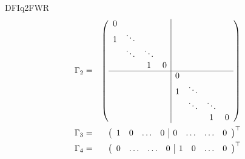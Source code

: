 \begin{command}{DFIq2FWR}
\begin{eqnarray}
\Gamma_2 &=&
\left(\begin{array}{cccc|cccc}
0 &&&\\
1 & \ddots &&\\
& \ddots & \ddots &\\
&& 1 & 0 \\
\hline &&&& 0 \\
&&&& 1 & \ddots \\
&&&& & \ddots & \ddots \\
&&&& & & 1 & 0
\end{array}\right)\\
\Gamma_3 &=&
\left(\begin{array}{cccc|cccc}
1 & 0 & \hdots & 0 & 0 & \hdots & \hdots & 0
\end{array}\right)^\top  \\
\Gamma_4 &=&
\left(\begin{array}{cccc|cccc}
0 & \hdots & \hdots & 0 & 1 & 0 & \hdots & 0
\end{array}\right)^\top
\end{eqnarray}
\end{command}


